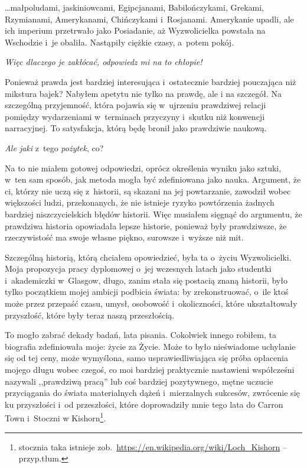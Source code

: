 \documentclass[oneside,polish,11pt,sfheadings]{mwbk}
\begin{document}
\ldots małpoludami, jaskiniowcami, Egipcjanami, Babilończykami, Grekami,
Rzymianami, Amerykanami, Chińczykami i~Rosjanami. Amerykanie upadli, ale
ich imperium przetrwało jako Posiadanie, aż Wyzwolicielka powstała na
Wschodzie i~je obaliła. Nastąpiły ciężkie czasy, a~potem pokój.

\textit{Więc dlaczego je zakłócać, odpowiedz mi na to chłopie!}

Ponieważ prawda jest bardziej interesująca i~ostatecznie bardziej
pouczająca niż mikstura bajek? Nabyłem apetytu nie tylko na prawdę, ale
i na szczegół. Na szczególną przyjemność, która pojawia się w~ujrzeniu
prawdziwej relacji pomiędzy wydarzeniami w~terminach przyczyny i~skutku
niż konwencji narracyjnej. To satysfakcja, którą będę bronił jako
prawdziwie naukową.

\textit{Ale jaki} z~tego \textit{pożytek}, co?

Na to nie miałem gotowej odpowiedzi, oprócz określenia wyniku jako
sztuki, w~ten sam sposób, jak metoda mogła być zdefiniowana jako nauka.
Argument, że ci, którzy nie uczą się z~historii, są skazani na jej
powtarzanie, zawodził wobec większości ludzi, przekonanych, że nie
istnieje ryzyko powtórzenia żadnych bardziej niszczycielskich błędów
historii. Więc musiałem sięgnąć do argumentu, że prawdziwa historia
opowiadała lepsze historie, ponieważ były prawdziwsze, że rzeczywistość
ma swoje własne piękno, surowsze i~wyższe niż mit.

Szczególną historią, którą chciałem opowiedzieć, była ta o~życiu
Wyzwolicielki. Moja propozycja pracy dyplomowej o~jej wczesnych latach
jako studentki i~akademiczki w~Glasgow, długo, zanim stała się postacią
znaną historii, było tylko początkiem mojej ambicji podbicia świata: by
zrekonstruować, o~ile ktoś może przez przepaść czasu, umysł, osobowość i~okoliczności, które ukształtowały przyszłość, które były teraz naszą
przeszłością.

To mogło zabrać dekady badań, lata pisania. Cokolwiek innego robiłem, ta
biografia zdefiniowała moje: życie za Życie. Może to było nieświadome
uchylanie się od tej ceny, może wymyślona, samo usprawiedliwiająca
się próba opłacenia mojego długu wobec czegoś, co moi bardziej
praktycznie nastawieni współcześni nazywali ,,prawdziwą pracą'' lub coś
bardziej pozytywnego, mętne uczucie przyciągania do świata materialnych
dążeń i~mierzalnych sukcesów, zwrócenie się ku przyszłości i~od
przeszłości, które doprowadziły mnie tego lata do Carron Town i~Stoczni
w Kishorn\footnote{ stocznia taka istnieje
zob.~\url{https://en.wikipedia.org/wiki/Loch\_Kishorn} -- przyp.tłum.}.
\end{document}

